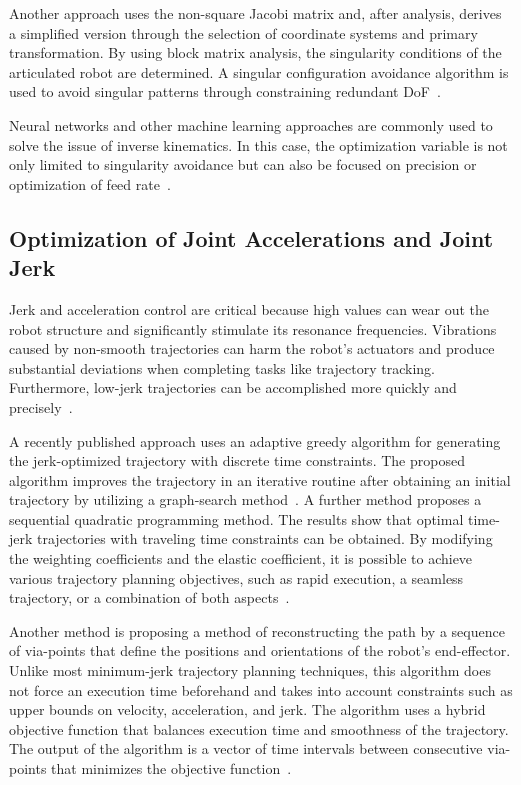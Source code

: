 Another approach uses the non-square Jacobi matrix and, after analysis, derives a simplified version through the selection of coordinate systems and primary transformation. By using block matrix analysis, the singularity conditions of the articulated robot are determined.
A singular configuration avoidance algorithm is used to avoid singular patterns through constraining redundant \acrshort{DoF}~\cite{Shi.2021}.

Neural networks and other machine learning approaches are commonly used to solve the issue of inverse kinematics. In this case, the optimization variable is not only limited to singularity avoidance but can also be focused on precision or optimization of feed rate~\cite{Wei.2014}.
\newpage
\subsection{Optimization of Joint Accelerations and Joint Jerk}

Jerk and acceleration control are critical because high values can wear out the robot structure and significantly stimulate its resonance frequencies. Vibrations caused by non-smooth trajectories can harm the robot's actuators and produce substantial deviations when completing tasks like trajectory tracking. Furthermore, low-jerk trajectories can be accomplished more quickly and precisely~\cite{Gasparetto.2010}.

A recently published approach uses an adaptive greedy algorithm for generating the jerk-optimized trajectory with discrete time constraints. The proposed algorithm improves the trajectory in an iterative routine after obtaining an initial trajectory by utilizing a graph-search method~\cite{Dai.2020}.
A further method proposes a sequential quadratic programming method. The results show that optimal time-jerk trajectories with traveling time constraints can be obtained. By modifying the weighting coefficients and the elastic coefficient, it is possible to achieve various trajectory planning objectives, such as rapid execution, a seamless trajectory, or a combination of both aspects~\cite{Jiang.2017}. 
 
Another method is proposing a method of reconstructing the path by a sequence of via-points that define the positions and orientations of the robot's end-effector. Unlike most minimum-jerk trajectory planning techniques, this algorithm does not force an execution time beforehand and takes into account constraints such as upper bounds on velocity, acceleration, and jerk. The algorithm uses a hybrid objective function that balances execution time and smoothness of the trajectory. The output of the algorithm is a vector of time intervals between consecutive via-points that minimizes the objective function~\cite{Gasparetto.2010}. 


